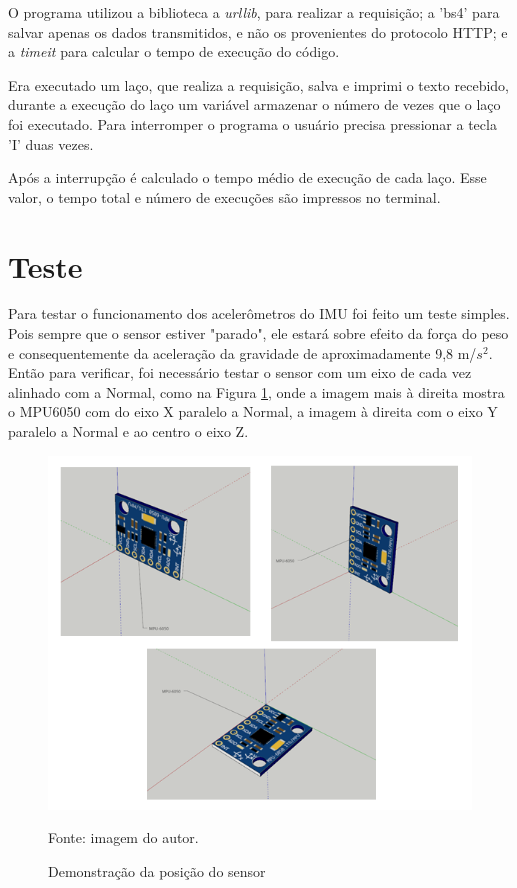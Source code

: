 	O programa utilizou a biblioteca a \textit{urllib}, para realizar a requisição; a 'bs4' para salvar apenas os dados transmitidos, e não os provenientes do protocolo HTTP; e a \textit{timeit} para calcular o tempo de execução do código.
	
	Era executado um laço, que realiza a requisição, salva e imprimi o texto recebido, durante a execução do laço um variável armazenar o número de vezes que o laço foi executado. Para interromper o programa o usuário precisa pressionar a tecla 'I' duas vezes. 
	
	Após a interrupção é calculado o tempo médio de execução de cada laço. Esse valor, o tempo total e número de execuções são impressos  no terminal.

\section {Teste}

	Para testar o funcionamento dos acelerômetros do IMU foi feito um teste simples. Pois sempre que o sensor estiver "parado", ele estará sobre efeito da força do peso e consequentemente da aceleração da gravidade de aproximadamente 9,8 m/$ s^2 $. Então para verificar, foi necessário testar o sensor com um eixo de cada vez alinhado com a Normal, como na Figura \ref{acel_validation}, onde a imagem mais à direita mostra o MPU6050 com do eixo X paralelo a Normal, a imagem à direita com o eixo Y paralelo a Normal e ao centro o eixo Z.
	
	\begin{figure}[h]
		\centering
		\includegraphics[keepaspectratio=true,scale=0.8]{figuras/validacao_acel.PNG}
		\caption{Demonstração da posição do sensor}
		Fonte: imagem do autor. 
		\label{acel_validation}	
	\end{figure}
	
